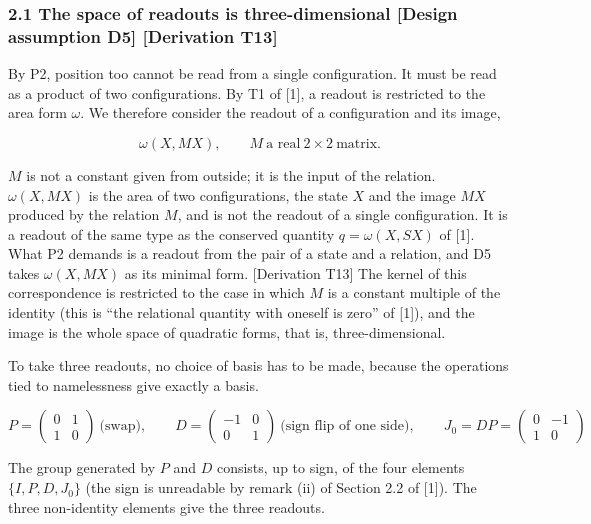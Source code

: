 \documentclass[
  a4paper,
]{article}
\begin{document}
\subsubsection{2.1 The space of readouts is three-dimensional {[}Design
assumption D5{]} {[}Derivation
T13{]}}\label{the-space-of-readouts-is-three-dimensional-design-assumption-d5-derivation-t13}

By P2, position too cannot be read from a single configuration. It must
be read as a product of two configurations. By T1 of {[}1{]}, a readout
is restricted to the area form \(\omega\). We therefore consider the
readout of a configuration and its image,

\[
\omega(X,MX),\qquad M\ \text{a real}\ 2\times2\ \text{matrix}.
\]

\(M\) is not a constant given from outside; it is the input of the
relation. \(\omega(X,MX)\) is the area of two configurations, the state
\(X\) and the image \(MX\) produced by the relation \(M\), and is not
the readout of a single configuration. It is a readout of the same type
as the conserved quantity \(q=\omega(X,SX)\) of {[}1{]}. What P2 demands
is a readout from the pair of a state and a relation, and D5 takes
\(\omega(X,MX)\) as its minimal form. {[}Derivation T13{]} The kernel of
this correspondence is restricted to the case in which \(M\) is a
constant multiple of the identity (this is ``the relational quantity
with oneself is zero'' of {[}1{]}), and the image is the whole space of
quadratic forms, that is, three-dimensional.

To take three readouts, no choice of basis has to be made, because the
operations tied to namelessness give exactly a basis.

\[
P=\begin{pmatrix}0&1\\1&0\end{pmatrix}\ \text{(swap)},\qquad
D=\begin{pmatrix}-1&0\\0&1\end{pmatrix}\ \text{(sign flip of one side)},\qquad
J_0=DP=\begin{pmatrix}0&-1\\1&0\end{pmatrix}
\]

The group generated by \(P\) and \(D\) consists, up to sign, of the four
elements \(\{I,P,D,J_0\}\) (the sign is unreadable by remark (ii) of
Section 2.2 of {[}1{]}). The three non-identity elements give the three
readouts.
\end{document}

